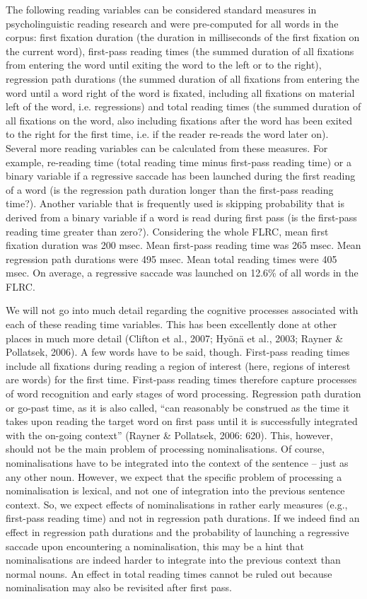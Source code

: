 \documentclass[output=paper]{langsci/langscibook}
\begin{document}
The following reading variables can be considered standard measures in psycholinguistic reading research and were pre-computed for all words in the corpus: first fixation duration (the duration in milliseconds of the first fixation on the current word), first-pass reading times (the summed duration of all fixations from entering the word until exiting the word to the left or to the right), regression path durations (the summed duration of all fixations from entering the word until a word right of the word is fixated, including all fixations on material left of the word, i.e. regressions) and total reading times (the summed duration of all fixations on the word, also including fixations after the word has been exited to the right for the first time, i.e. if the reader re-reads the word later on). Several more reading variables can be calculated from these measures. For example, re-reading time (total reading time minus first-pass reading time) or a binary variable if a regressive saccade has been launched during the first reading of a word (is the regression path duration longer than the first-pass reading time?). Another variable that is frequently used is skipping probability that is derived from a binary variable if a word is read during first pass (is the first-pass reading time greater than zero?). Considering the whole FLRC, mean first fixation duration was 200 msec. Mean first-pass reading time was 265 msec. Mean regression path durations were 495 msec. Mean total reading times were 405 msec. On average, a regressive saccade was launched on 12.6\% of all words in the FLRC. 

We will not go into much detail regarding the cognitive processes associated with each of these reading time variables. This has been excellently done at other places in much more detail (Clifton et al., 2007; Hy\"{o}n\"{a} et al., 2003; Rayner \& Pollatsek, 2006). A few words have to be said, though. First-pass reading times include all fixations during reading a region of interest (here, regions of interest are words) for the first time. First-pass reading times therefore capture processes of word recognition and early stages of word processing. Regression path duration or go-past time, as it is also called, “can reasonably be construed as the time it takes upon reading the target word on first pass until it is successfully integrated with the on-going context” (Rayner \& Pollatsek, 2006: 620). This, however, should not be the main problem of processing nominalisations. Of course, nominalisations have to be integrated into the context of the sentence – just as any other noun. However, we expect that the specific problem of processing a nominalisation is lexical, and not one of integration into the previous sentence context. So, we expect effects of nominalisations in rather early measures (e.g., first-pass reading time) and not in regression path durations. If we indeed find an effect in regression path durations and the probability of launching a regressive saccade upon encountering a nominalisation, this may be a hint that nominalisations are indeed harder to integrate into the previous context than normal nouns. An effect in total reading times cannot be ruled out because nominalisation may also be revisited after first pass.
\end{document}
